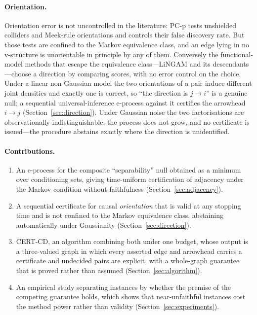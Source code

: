 \documentclass[11pt,a4paper]{article}
\theoremstyle{definition}
\theoremstyle{remark}
\begin{document}
\paragraph{Orientation.} Orientation error is not uncontrolled in the
literature: PC-p \citep{strobl2017estimating} tests unshielded colliders and
Meek-rule orientations and controls their false discovery rate. But those tests
are confined to the Markov equivalence class, and an edge lying in no
v-structure is unorientable in principle by any of them. Conversely the
functional-model methods that escape the equivalence class---LiNGAM and its
descendants \citep{shimizu2006linear,shimizu2011directlingam}---choose a
direction by comparing scores, with no error control on the choice. Under a
linear non-Gaussian model the two orientations of a pair induce different joint
densities and exactly one is correct, so ``the direction is $j \to i$'' is a
genuine null; a sequential universal-inference e-process against it certifies
the arrowhead $i \to j$ (Section~\ref{sec:direction}). Under Gaussian noise the
two factorisations are observationally indistinguishable, the process does not
grow, and no certificate is issued---the procedure abstains exactly where the
direction is unidentified.

\paragraph{Contributions.}
\begin{enumerate}
\item An e-process for the composite ``separability'' null obtained as a
  minimum over conditioning sets, giving time-uniform certification of
  adjacency under the Markov condition without faithfulness
  (Section~\ref{sec:adjacency}).
\item A sequential certificate for causal \emph{orientation} that is valid at
  any stopping time and is not confined to the Markov equivalence class,
  abstaining automatically under Gaussianity (Section~\ref{sec:direction}).
\item CERT-CD, an algorithm combining both under one budget, whose output is a
  three-valued graph in which every asserted edge and arrowhead carries a
  certificate and undecided pairs are explicit, with a whole-graph guarantee
  that is proved rather than assumed (Section~\ref{sec:algorithm}).
\item An empirical study separating instances by whether the premise of the
  competing guarantee holds, which shows that near-unfaithful instances cost
  the method power rather than validity (Section~\ref{sec:experiments}).
\end{enumerate}
\end{document}
